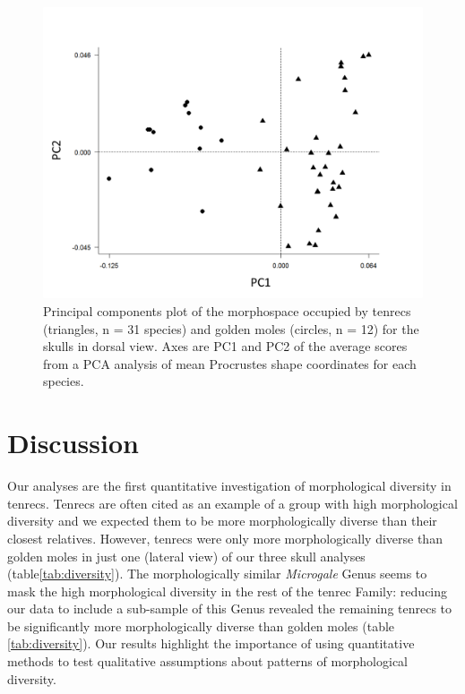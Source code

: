 \documentclass[12pt,a4paper]{article}
\begin{document}
		
	\begin{figure}[H]
	\centering
	\includegraphics[width=1\linewidth]{figures/skdors_PCA_allspecies_BW.png}
	\caption[Morphospace (principal components) plot of morphological diversity in dorsal views of tenrec and golden mole skulls.]
		{Principal components plot of the morphospace occupied by tenrecs (triangles, n = 31 species) and golden moles (circles, n = 12) for the skulls in dorsal view. Axes are PC1 and PC2 of the average scores from a PCA analysis of mean Procrustes shape coordinates for each species. }
	\label{fig:skdorsPCA}
	\end{figure}


\section{Discussion} 

	Our analyses are the first quantitative investigation of morphological diversity in tenrecs. Tenrecs are often cited as an example of a group with high morphological diversity \citep{Olson2013, Soarimalala2011, Eisenberg1969} and we expected them to be more morphologically diverse than their closest relatives. However, tenrecs were only more morphologically diverse than golden moles in just one (lateral view) of our three skull analyses (table\ref{tab:diversity}). The morphologically similar \textit{Microgale} Genus seems to mask the high morphological diversity in the rest of the tenrec Family: reducing our data to include a sub-sample of this Genus revealed the remaining tenrecs to be significantly more morphologically diverse than golden moles (table \ref{tab:diversity}). Our results highlight the importance of using quantitative methods to test qualitative assumptions about patterns of morphological diversity.
\end{document}
